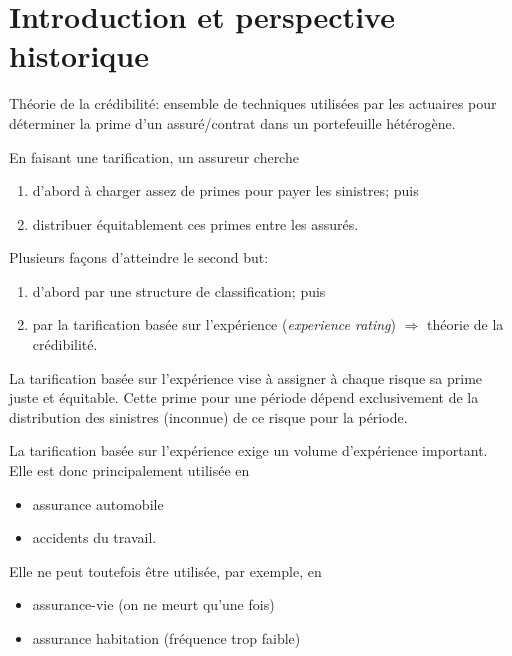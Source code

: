 
\chapter{Introduction et perspective historique}
\label{chap:introduction-historique:introduction}

Théorie de la crédibilité: ensemble de techniques utilisées par les
actuaires pour déterminer la prime d'un assuré/contrat dans un
portefeuille hétérogène.

En faisant une tarification, un assureur cherche
\begin{enumerate}
\item d'abord à charger assez de primes pour payer les sinistres; puis
\item distribuer équitablement ces primes entre les assurés.
\end{enumerate}

Plusieurs façons d'atteindre le second but:
\begin{enumerate}
\item d'abord par une structure de classification; puis
\item par la tarification basée sur l'expérience (\emph{experience
    rating}) $\Rightarrow$ théorie de la crédibilité.
\end{enumerate}

\begin{definition}
  La tarification basée sur l'expérience vise à assigner à chaque
  risque sa prime juste et équitable. Cette prime pour une période
  dépend exclusivement de la distribution des sinistres (inconnue) de
  ce risque pour la période. \citep{Buhlmann:credibility:1969}
\end{definition}

La tarification basée sur l'expérience exige un volume d'expérience
important. Elle est donc principalement utilisée en
\begin{itemize}
\item assurance automobile
\item accidents du travail.
\end{itemize}
Elle ne peut toutefois être utilisée, par exemple, en
\begin{itemize}
\item assurance-vie (on ne meurt qu'une fois)
\item assurance habitation (fréquence trop faible)
\end{itemize}


